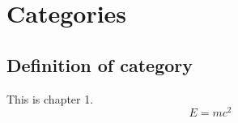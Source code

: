 \chapter{Categories}
\label{chap:chap1}


\section{Definition of category}

This is chapter 1.
\begin{dmath}
E = mc^2
\end{dmath}
